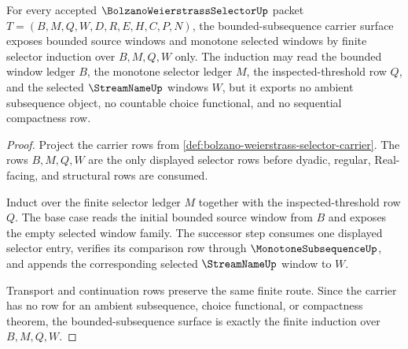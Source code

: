 \begin{theorem}
\label{thm:bolzano-weierstrass-selector-bounded-subsequence-carrier}
For every accepted $\BolzanoWeierstrassSelectorUp$ packet $T=(B,M,Q,W,D,R,E,H,C,P,N)$, the bounded-subsequence carrier surface exposes bounded source windows and monotone selected windows by finite selector induction over $B,M,Q,W$ only. The induction may read the bounded window ledger $B$, the monotone selector ledger $M$, the inspected-threshold row $Q$, and the selected $\StreamNameUp$ windows $W$, but it exports no ambient subsequence object, no countable choice functional, and no sequential compactness row.
\end{theorem}
\begin{proof}
Project the carrier rows from \autoref{def:bolzano-weierstrass-selector-carrier}. The rows $B,M,Q,W$ are the only displayed selector rows before dyadic, regular, Real-facing, and structural rows are consumed.

Induct over the finite selector ledger $M$ together with the inspected-threshold row $Q$. The base case reads the initial bounded source window from $B$ and exposes the empty selected window family. The successor step consumes one displayed selector entry, verifies its comparison row through $\MonotoneSubsequenceUp$, and appends the corresponding selected $\StreamNameUp$ window to $W$.

Transport and continuation rows preserve the same finite route. Since the carrier has no row for an ambient subsequence, choice functional, or compactness theorem, the bounded-subsequence surface is exactly the finite induction over $B,M,Q,W$.
\end{proof}

